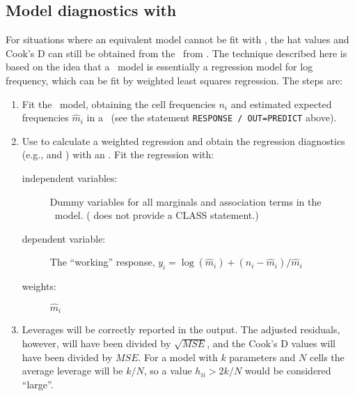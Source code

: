 \subsection{Model diagnostics with }\label{sec:loglin-inflcat}

For situations where an equivalent model cannot be fit with ,
the hat values and Cook's D can still be obtained from the \ODS\
from .
The technique
described here is based on the idea \citep{Christensen:97}
that a \loglin\ model is essentially a regression model for log
frequency, which can be fit by weighted least squares regression.
The steps are:
\begin{enumerate}

\item Fit the \loglin\ model, obtaining the cell frequencies
	\(n_i\) and estimated expected frequencies \(\widehat{m}_i\) in a
	\Dset\ (see the statement {\tt RESPONSE / OUT=PREDICT}
	above).

\item Use  to calculate a weighted regression and obtain
       the regression diagnostics (e.g., \pname{h} and )
		 with an .  Fit the regression with:

	\begin{description}
	\item[independent variables:]  Dummy variables for all
			marginals and association terms in the \loglin\
			model. ( does not provide a CLASS statement.)
	\item[dependent variable:]  The ``working'' response, \(y_i  =
			\log ( \widehat{m}_i )  +  ( n_i - \widehat{m}_i ) /  \widehat{m}_i\)
	\item[weights:]  \(\widehat{m}_i\)
	\end{description}

\item Leverages will be correctly reported in the output.  The
	adjusted residuals, however, will have been divided by
	\(\sqrt{MSE}\), and the Cook's D values will have been divided
	by \(MSE\).  For a model with \(k\) parameters and \(N\) cells
	the average leverage will be \(k/N\), so a value \(h_{ii} > 2 k
	/  N\) would be considered ``large''.

\end{enumerate}


